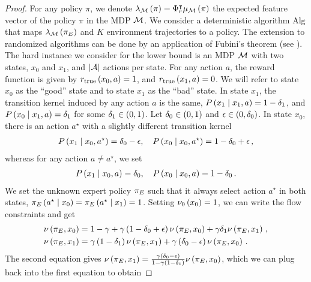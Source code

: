 \bigskip
\begin{proof}
    For any policy $\pi$, we denote $\lambda_{\mathcal{M}} \left( \pi \right) = \Phi_r^\intercal \mu_{\mathcal{M}} \left( \pi \right)$ the expected feature vector of the policy $\pi$ in the MDP $\mathcal{M}$. We consider a deterministic algorithm $\mathrm{Alg}$ that maps $\lambda_{\mathcal{M}} \left( {\pi_E} \right)$ and $K$ environment trajectories to a policy. The extension to randomized algorithms can be done by an application of Fubini's theorem (see \cite{bubeck2012regret}). The hard instance we consider for the lower bound is an MDP $\mathcal{M}$ with two states, $x_0$ and $x_1$, and $\left|\mathcal{A}\right|$ actions per state. For any action $a$, the reward function is given by $r_{\textup{true}} \left( x_0, a \right) = 1$, and $r_{\textup{true}} \left( x_1, a \right) = 0$. We will refer to state $x_0$ as the ``good'' state and to state $x_1$ as the ``bad'' state.  In state $x_1$, the transition kernel induced by any action $a$ is the same, \ie $P \left( x_1 \mathrel{}\middle|\mathrel{} x_1, a \right) = 1 - \delta_1$, and $P \left( x_0 \mathrel{}\middle|\mathrel{} x_1, a \right) = \delta_1$ for some $\delta_1 \in \left( 0, 1 \right)$. Let $\delta_0 \in \left( 0, 1 \right)$ and $\epsilon \in \left( 0, \delta_0 \right)$. In state $x_0$, there is an action $a^\star$ with a slightly different transition kernel
    \begin{align*}
        P \left( x_1 \mathrel{}\middle|\mathrel{} x_0, a^\star \right) = \delta_0 - \epsilon, \quad P \left( x_0 \mathrel{}\middle|\mathrel{} x_0, a^\star \right) = 1 - \delta_0 + \epsilon\,,
    \end{align*}
    whereas for any action $a \neq a^\star$, we set
    \begin{align*}
        P \left( x_1 \mathrel{}\middle|\mathrel{} x_0, a \right) = \delta_0, \quad P \left( x_0 \mathrel{}\middle|\mathrel{} x_0, a \right) = 1 - \delta_0\,.
    \end{align*}
    We set the unknown expert policy ${\pi_E}$ such that it always select action $a^\star$ in both states, \ie ${\pi_E} \left( a^\star \mathrel{}\middle|\mathrel{} x_0 \right) = {\pi_E} \left( a^\star \mathrel{}\middle|\mathrel{} x_1 \right) = 1$. Setting $\nu_0 \left( x_0 \right) = 1$, we can write the flow constraints and get
    \begin{align*}
        &\nu \left( {\pi_E}, x_0 \right) = 1 - \gamma + \gamma \left( 1 - \delta_0 + \epsilon \right) \nu \left( {\pi_E}, x_0 \right) + \gamma \delta_1 \nu \left( {\pi_E}, x_1 \right)\,, \\
        &\nu \left( {\pi_E}, x_1 \right) = \gamma \left( 1 - \delta_1 \right) \nu \left( {\pi_E}, x_1 \right) + \gamma \left( \delta_0 - \epsilon \right) \nu \left( {\pi_E}, x_0 \right)\,.
    \end{align*}
    The second equation gives $\nu \left( {\pi_E}, x_1 \right) = \frac{\gamma \left( \delta_0 - \epsilon \right)}{1 - \gamma \left( 1 - \delta_1 \right)} \nu \left( {\pi_E}, x_0 \right)$, which we can plug back into the first equation to obtain

\end{proof}
